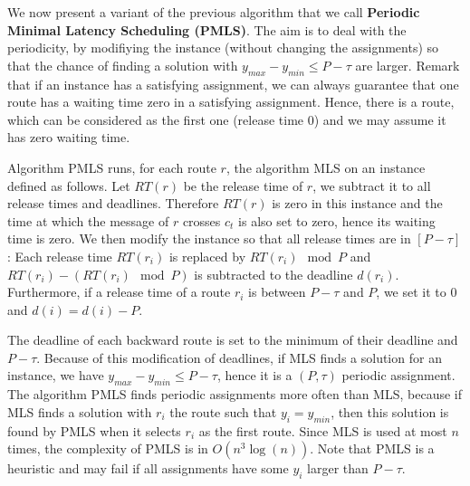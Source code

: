 \documentclass[10pt, conference, letterpaper]{IEEEtran}
\begin{document}
     
     We now present a variant of the previous algorithm that we call {\bf Periodic Minimal Latency Scheduling (PMLS)}. The aim is to deal with the periodicity, by modifiying the instance (without changing the assignments) so that the chance of finding a solution with $y_{max}- y_{min} \leq P -\tau $ are larger.  Remark that if an instance has a satisfying assignment, we can always guarantee that one route has a waiting time zero in a satisfying assignment. Hence, there is a route, which can be considered as the first one (release time $0$) and we may assume it has zero waiting time.
     
     Algorithm PMLS runs, for each route $r$, the algorithm MLS on an instance defined as follows. 
     Let $RT(r)$ be the release time of $r$, we subtract it to all release times and deadlines.
     Therefore $RT(r)$ is zero in this instance and the time at which the message of $r$ crosses $c_t$ is also set to zero, hence its waiting time is zero.  We then modify the instance so that all release times are in $[P-\tau]$: Each release time $RT(r_i)$ is replaced by $RT(r_i) \mod P$ and $RT(r_i) - (RT(r_i) \mod P)$ is subtracted to the deadline $d(r_i)$. Furthermore, if a release time of a route $r_i$ is between $ P-\tau$ and $P$, we set it to $0$ and $d(i) = d(i) - P$. 
     
     The deadline of each backward route is set to the minimum of their deadline and $P - \tau$. Because of this modification of deadlines, if MLS finds a solution for an instance, we have $y_{max}- y_{min} \leq P -\tau $, hence it is a $(P,\tau)$ periodic assignment.  The algorithm PMLS finds periodic assignments more often than MLS, because if MLS finds a solution with $r_i$ the route such that $y_i = y_{min}$, then this solution is found by PMLS when it selects $r_i$ as the first route. Since MLS is used at most $n$ times, the complexity of PMLS is in $O(n^3\log(n))$. Note that PMLS is a heuristic and may fail if all assignments have some $y_i$ larger than $P - \tau$.
     
%   
%     
% 
%     
% 
% 
\end{document}
